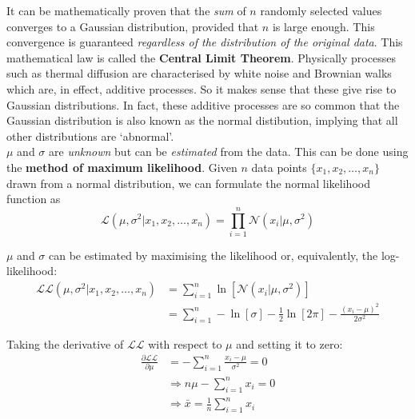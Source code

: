 \begin{refsection}
It can be mathematically proven that the \emph{sum} of $n$ randomly
selected values converges to a Gaussian distribution, provided that
$n$ is large enough. This convergence is guaranteed \textit{regardless
  of the distribution of the original data}.  This mathematical law is
called the \textbf{Central Limit Theorem}. Physically processes such
as thermal diffusion are characterised by white noise and Brownian
walks which are, in effect, additive processes.  So it makes sense
that these give rise to Gaussian distributions. In fact, these
additive processes are so common that the Gaussian distribution is
also known as the normal distibution, implying that all other
distributions are `abnormal'.\\

$\mu$ and $\sigma$ are \emph{unknown} but can be \emph{estimated} from
the data. This can be done using the \textbf{method of maximum
  likelihood}.  Given $n$ data points $\{x_1, x_2, \ldots, x_n\}$
drawn from a normal distribution, we can formulate the normal
likelihood function as
\begin{equation}
  \mathcal{L}(\mu,\sigma^2|x_1,x_2,\ldots,x_n) =
  \prod\limits_{i=1}^{n}\mathcal{N}(x_i|\mu,\sigma^2)
  \label{eq:Lnorm}
\end{equation}

$\mu$ and $\sigma$ can be estimated by maximising the likelihood or,
equivalently, the log-likelihood:
\begin{equation}
  \begin{split}
    \mathcal{LL}(\mu,\sigma^2|x_1,x_2,\ldots,x_n) & =
    \sum\limits_{i=1}^{n}\ln\left[\mathcal{N}(x_i|\mu,\sigma^2)\right] \\ & =
    \sum\limits_{i=1}^{n} -\ln[\sigma] - \frac{1}{2}\ln[2\pi] -
    \frac{(x_i-\mu)^2}{2\sigma^2}
  \end{split}
  \label{eq:LLnorm}
\end{equation}

Taking the derivative of $\mathcal{LL}$ with respect to $\mu$ and
setting it to zero:
\begin{equation}
  \begin{split}
    \frac{\partial{\mathcal{LL}}}{\partial{\mu}} & =
    - \sum\limits_{i=1}^{n} \frac{x_i-\mu}{\sigma^2} = 0 \\
    & \Rightarrow n\mu - \sum\limits_{i=1}^{n} x_i = 0 \\
    & \Rightarrow \bar{x} = \frac{1}{n}\sum\limits_{i=1}^{n}x_i
  \end{split}
  \label{eq:arithmeticmean}
\end{equation}


\end{refsection}
